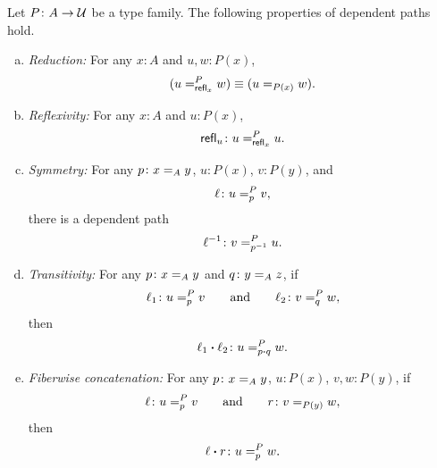 \begin{prop}\label{prop:eqt}
    Let\/ $P\colon A\to\univ$ be a type family. The following properties of dependent paths hold.

    \begin{enumerate}[a),font=\upshape]
        \item \emph{Reduction:} For any\/ $x\colon A$ and\/ $u,w\colon P(x)$,
        \[
            (u=_{\mathsf{refl}_x}^{P}w)
            \equiv
            (u\mathrel{=_{P(x)}}w).
        \]

        \item \emph{Reflexivity:} For any\/ $x\colon A$ and\/ $u\colon P(x)$,
        \[
            \fun{refl}_u\colon u\eqt{\fun{refl}_x}{P}u.
        \]

        \item \emph{Symmetry:} For any\/ $p\colon x\eq{A}y$,\/ $u\colon P(x)$,\/ $v\colon P(y)$, and\/
        \[
            \ell\colon u\eqt{p}{P}v,
        \]
        there is a dependent path
        \[
            \ell^{-1}\colon v\eqt{p^{-1}}{P}u.
        \]

        \item \emph{Transitivity:} For any\/ $p\colon x\eq{A}y$ and\/ $q\colon y\eq{A}z$,\/ if
        \[
            \ell_1\colon u\eqt{p}{P}v
            \qquad\text{and}\qquad
            \ell_2\colon v\eqt{q}{P}w,
        \]
        then
        \[
            \ell_1\ct\ell_2\colon u\eqt{p\ct q}{P}w.
        \]

        \item \emph{Fiberwise concatenation:} For any\/ $p\colon x\eq{A}y$,\/ $u\colon P(x)$,\/ $v,w\colon P(y)$,\/ if
        \[
            \ell\colon u\eqt{p}{P}v
            \qquad\text{and}\qquad
            r\colon v\eq{P(y)}w,
        \]
        then
        \[
            \ell\ct r\colon u\eqt{p}{P}w.
        \]
    \end{enumerate}
\end{prop}

